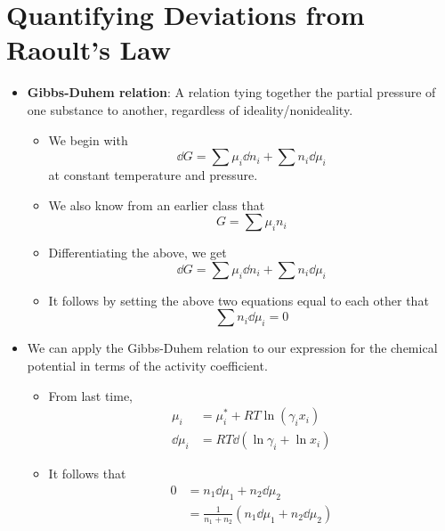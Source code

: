 \documentclass[../notes.tex]{subfiles}
\begin{document}
\section{Quantifying Deviations from Raoult's Law}
\begin{itemize}
    \item {}\textbf{Gibbs-Duhem relation}: A relation tying together the partial pressure of one substance to another, regardless of ideality/nonideality.
    \begin{itemize}
        \item We begin with
        \begin{equation*}
            \dd{G} = \sum\mu_i\dd{n_i}+\sum n_i\dd{\mu_i}
        \end{equation*}
        at constant temperature and pressure.
        \item We also know from an earlier class that
        \begin{equation*}
            G = \sum\mu_in_i
        \end{equation*}
        \item Differentiating the above, we get
        \begin{equation*}
            \dd{G} = \sum\mu_i\dd{n_i}+\sum n_i\dd{\mu_i}
        \end{equation*}
        \item It follows by setting the above two equations equal to each other that
        \begin{equation*}
            \sum n_i\dd{\mu_i} = 0
        \end{equation*}
    \end{itemize}
    \item We can apply the Gibbs-Duhem relation to our expression for the chemical potential in terms of the activity coefficient.
    \begin{itemize}
        \item From last time,
        \begin{align*}
            \mu_i &= \mu_i^*+RT\ln(\gamma_ix_i)\\
            \dd{\mu_i} &= RT\dd{(\ln\gamma_i+\ln x_i)}
        \end{align*}
        \item It follows that
        \begin{align*}
            0 &= n_1\dd{\mu_1}+n_2\dd{\mu_2}\\
            &= \frac{1}{n_1+n_2}(n_1\dd{\mu_1}+n_2\dd{\mu_2})\\

\end{align*}
\end{itemize}
\end{itemize}
\end{document}
